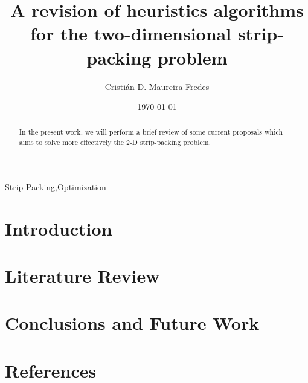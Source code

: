 \documentclass[preprint,authoryear,12pt]{elsarticle}
\begin{document}
\begin{frontmatter}

\title{A revision of heuristics algorithms for the two-dimensional strip-packing problem}
\author[utfsm]{Cristián D. Maureira Fredes}


\address[utfsm]{Departamento de Informática, Universidad Técnica Federico Santa María, Av. España 1680, Valparaiso, Chile}
\date{\today}

\begin{abstract}
In the present work,
we will perform a brief review of some current proposals
which aims to solve more effectively the 2-D strip-packing problem.
\end{abstract}

\begin{keyword}
Strip Packing\sep Optimization
\end{keyword}

\end{frontmatter}

\section{Introduction}
\label{introduction}



\section{Literature Review}
\label{stateofart}



\section{Conclusions and Future Work}
\label{conclusions}


\section*{References}
%


\end{document}
